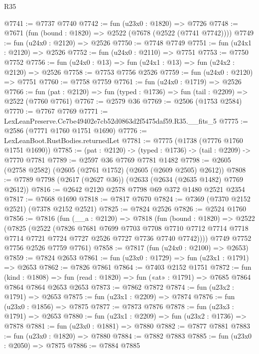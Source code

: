 \begin{lexlean}{R35}
\begin{coremodule}
@7741 := @7737 @7740
@7742 := fun (u23x0 : @1820) => @7726
@7748 := @7671 (fun (bound : @1820) => @2522 (@7678 (@2522 (@7741 @7742))))
@7749 := fun (u24x0 : @2120) => @2526
@7750 := @7748 @7749
@7751 := fun (u24x1 : @2120) => @2526
@7752 := fun (u24x0 : @2110) => @7751
@7753 := @7750 @7752
@7756 := fun (u24x0 : @13) => fun (u24x1 : @13) => fun (u24x2 : @2120) => @2526
@7758 := @7753 @7756 @2526
@7759 := fun (u24x0 : @2120) => @7751
@7760 := @7758 @7759
@7761 := fun (u24x0 : @1719) => @2526
@7766 := fun (pat : @2120) => fun (typed : @1736) => fun (tail : @2209) => @2522 (@7760 @7761)
@7767 := @2579 @36
@7769 := @2506 (@1753 @2584)
@7770 := @7767 @7769
@7771 := LexLeanPreserve.Ce7be49402e7cb52d0863d2f5475daf59.R35.__fits_5
@7775 := @2586 (@7771 @1760 @1751 @1690)
@7776 := LexLeanBoot.RustBodies.returnedLet
@7781 := @7775 (@1738 (@7776 @1760 @1751 @1690))
@7785 := (pat : @2120) -> (typed : @1736) -> (tail : @2209) -> @7770 @7781
@7789 := @2597 @36 @7769 @7781 @1482
@7798 := @2605 (@2758 @2582) (@2605 (@2761 @1752) (@2605 (@2609 @2505) @2612))
@7808 := @7789 @7798 (@2617 (@2627 @36)) (@2633 (@2634 (@2635 @1482) @7769 @2612))
@7816 := @2642 @2120 @2578 @7798 @69 @372 @1480 @2521 @2354
@7817 := @7668 @1690
@7818 := @7817 @7670
@7824 := @7369 (@7370 @2152 @2521) (@7378 @2152 @2521)
@7825 := @7824 @2526
@7826 := @2524 @1760
@7856 := @7816
    (fun (__a : @2120) =>
    @7818
      (fun (bound : @1820) =>
      @2522
        (@7825
          (@2522
            (@7826
              @7681
              @7699
              @7703
              @7708
              @7710
              @7712
              @7714
              @7718
              @7714
              @7721
              @7724
              @7727
              @2526
              @7727
              @7736
              @7740
              @7742))))
      @7749
      @7752
      @7756
      @2526
      @7759
      @7761)
@7858 := @7817 (fun (u24x0 : @2100) => @2653)
@7859 := @7824 @2653
@7861 := fun (u23x0 : @1729) => fun (u23x1 : @1791) => @2653
@7862 := @7826 @7861
@7864 := @7403 @2152 @1751
@7872 := fun (kind : @1808) =>
  fun (read : @1820) => fun («at» : @1791) => @7685 @7864 @7864 @7864 @2653 @2653
@7873 := @7862 @7872
@7874 := fun (u23x2 : @1791) => @2653
@7875 := fun (u23x1 : @2209) => @7874
@7876 := fun (u23x0 : @1856) => @7875
@7877 := @7873 @7876
@7878 := fun (u23x3 : @1791) => @2653
@7880 := fun (u23x1 : @2209) => fun (u23x2 : @1736) => @7878
@7881 := fun (u23x0 : @1881) => @7880
@7882 := @7877 @7881
@7883 := fun (u23x0 : @1820) => @7880
@7884 := @7882 @7883
@7885 := fun (u23x0 : @2050) => @7875
@7886 := @7884 @7885

\end{coremodule}
\end{lexlean}
